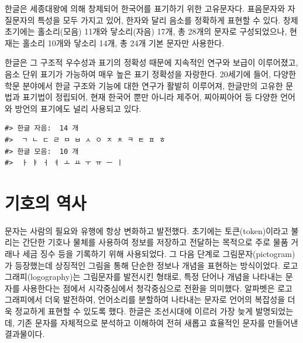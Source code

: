 \documentclass[
  letterpaper,
]{book}
\begin{document}
한글은 세종대왕에 의해 창제되어 한국어를 표기하기 위한 고유문자다.
표음문자와 자질문자의 특성을 모두 가지고 있어, 한자와 달리 음소를
정확하게 표현할 수 있다. 창제 초기에는 홀소리(모음) 11개와 닿소리(자음)
17개, 총 28개의 문자로 구성되었으나, 현재는 홀소리 10개와 닿소리 14개,
총 24개 기본 문자만 사용한다.

한글은 그 구조적 우수성과 표기의 정확성 때문에 지속적인 연구와 보급이
이루어졌고, 음소 단위 표기가 가능하여 매우 높은 표기 정확성을 자랑한다.
20세기에 들어, 다양한 학문 분야에서 한글 구조와 기능에 대한 연구가
활발히 이루어져, 한글만의 고유한 문법과 표기법이 정립되어, 현재 한국어
뿐만 아니라 제주어, 찌아찌아어 등 다양한 언어와 방언의 표기에도 널리
사용되고 있다.

\begin{verbatim}
#> 한글 자음:  14 개
#>  ㄱ ㄴ ㄷ ㄹ ㅁ ㅂ ㅅ ㅇ ㅈ ㅊ ㅋ ㅌ ㅍ ㅎ
#> 한글 모음:  10 개
#>  ㅏ ㅑ ㅓ ㅕ ㅗ ㅛ ㅜ ㅠ ㅡ ㅣ
\end{verbatim}

\hypertarget{uxae30uxd638uxc758-uxc5eduxc0ac}{%
\section{기호의 역사}\label{uxae30uxd638uxc758-uxc5eduxc0ac}}

문자는 사람의 필요와 유행에 항상 변화하고 발전했다. 초기에는
토큰(token)이라고 불리는 간단한 기호나 물체를 사용하여 정보를 저장하고
전달하는 목적으로 주로 물품 거래나 세금 징수 등을 기록하기 위해
사용되었다. 그 다음 단계로 그림문자(pictogram)가 등장했는데 상징적인
그림을 통해 단순한 정보나 개념을 표현하는 방식이었다.
로고그래피(logography)는 그림문자를 발전시킨 형태로, 특정 단어나 개념을
나타내는 문자를 사용한다는 점에서 시각중심에서 청각중심으로 전환을
의미했다. 알파벳은 로고그래피에서 더욱 발전하여, 언어소리를 분할하여
나타내는 문자로 언어의 복잡성을 더욱 정교하게 표현할 수 있도록 했다.
한글은 조선시대에 이르러 가장 늦게 발명되었는데, 기존 문자를 자체적으로
분석하고 이해하여 전혀 새롭고 효율적인 문자를 만들어낸 결과물이다.
\end{document}
